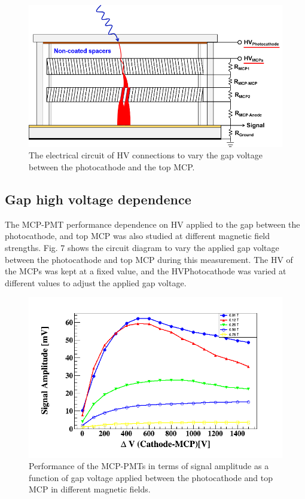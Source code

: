 \documentclass[preprint,5p]{elsarticle}
\begin{document}
\begin{figure}[tbp]
\centering \includegraphics[scale=0.98]{fig/pAQ3pS.png}
\caption{The electrical circuit of HV connections to vary the gap voltage 
   between the photocathode and the top MCP.} \label{fig:design}
\end{figure}

\subsection{Gap high voltage dependence} \label{}
The MCP-PMT performance dependence on HV applied to the gap between the 
photocathode, and top MCP was also studied at different magnetic field 
strengths. Fig. 7 shows the circuit diagram to vary the applied gap voltage 
between the photocathode and top MCP during this measurement. The HV of the 
MCPs was kept at a fixed value, and the HVPhotocathode was varied at different 
values to adjust the applied gap voltage. 

\begin{figure}[tbp]
\centering \includegraphics[scale=0.37]{fig/1uQ9Dn.png}
\caption{Performance of the MCP-PMTs in terms of signal amplitude as a function 
   of gap voltage applied between the photocathode and top MCP in different 
   magnetic fields.} \label{fig:design}
\end{figure} 
\end{document}

